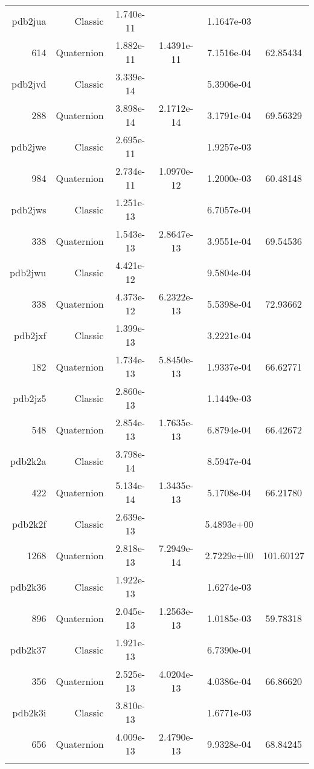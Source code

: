 \begin{xltabular}{\textwidth}{r|rS[table-format=1.3e+2]S[table-format=1.4e+2]S[table-format=1.4e+2]S[table-format=-1.5]}
pdb2jua & Classic & 1.740e-11 &  & 1.1647e-03 & \\
614 & Quaternion & 1.882e-11 & 1.4391e-11 & 7.1516e-04 & 62.85434\\  \addlinespace
pdb2jvd & Classic & 3.339e-14 &  & 5.3906e-04 & \\
288 & Quaternion & 3.898e-14 & 2.1712e-14 & 3.1791e-04 & 69.56329\\  \addlinespace
pdb2jwe & Classic & 2.695e-11 &  & 1.9257e-03 & \\
984 & Quaternion & 2.734e-11 & 1.0970e-12 & 1.2000e-03 & 60.48148\\  \addlinespace
pdb2jws & Classic & 1.251e-13 &  & 6.7057e-04 & \\
338 & Quaternion & 1.543e-13 & 2.8647e-13 & 3.9551e-04 & 69.54536\\  \addlinespace
pdb2jwu & Classic & 4.421e-12 &  & 9.5804e-04 & \\
338 & Quaternion & 4.373e-12 & 6.2322e-13 & 5.5398e-04 & 72.93662\\  \addlinespace
pdb2jxf & Classic & 1.399e-13 &  & 3.2221e-04 & \\
182 & Quaternion & 1.734e-13 & 5.8450e-13 & 1.9337e-04 & 66.62771\\  \addlinespace
pdb2jz5 & Classic & 2.860e-13 &  & 1.1449e-03 & \\
548 & Quaternion & 2.854e-13 & 1.7635e-13 & 6.8794e-04 & 66.42672\\  \addlinespace
pdb2k2a & Classic & 3.798e-14 &  & 8.5947e-04 & \\
422 & Quaternion & 5.134e-14 & 1.3435e-13 & 5.1708e-04 & 66.21780\\  \addlinespace
pdb2k2f & Classic & 2.639e-13 &  & 5.4893e+00 & \\
1268 & Quaternion & 2.818e-13 & 7.2949e-14 & 2.7229e+00 & 101.60127\\  \addlinespace
pdb2k36 & Classic & 1.922e-13 &  & 1.6274e-03 & \\
896 & Quaternion & 2.045e-13 & 1.2563e-13 & 1.0185e-03 & 59.78318\\  \addlinespace
pdb2k37 & Classic & 1.921e-13 &  & 6.7390e-04 & \\
356 & Quaternion & 2.525e-13 & 4.0204e-13 & 4.0386e-04 & 66.86620\\  \addlinespace
pdb2k3i & Classic & 3.810e-13 &  & 1.6771e-03 & \\
656 & Quaternion & 4.009e-13 & 2.4790e-13 & 9.9328e-04 & 68.84245\\  \addlinespace

\end{xltabular}
